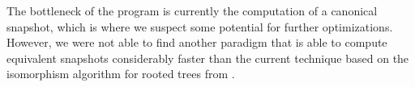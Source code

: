 The bottleneck of the program is currently the computation of a canonical snapshot, which is where we suspect some potential for further optimizations. However, we were not able to find another paradigm that is able to compute equivalent snapshots considerably faster than the current technique based on the isomorphism algorithm for rooted trees from \cite{aho1974design}.

